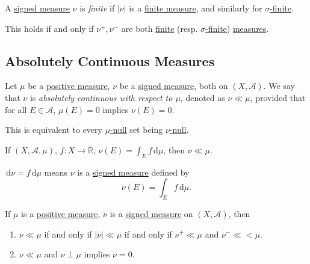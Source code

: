\begin{definition}\label{def:finite-signed-measure}
	A \hyperref[def:signed-measure]{signed measure} \(\nu\) is \emph{finite} if \(\left\vert \nu \right\vert\) is a \hyperref[def:finite-measure]{finite measure},
	and similarly for \hyperref[def:finite-measure]{\(\sigma\)-finite}.
\end{definition}
\begin{remark}
	This holds if and only if \(\nu^+,\nu^-\) are both \hyperref[def:finite-measure]{finite} (resp. \hyperref[def:finite-measure]{\(\sigma\)-finite})
	\hyperref[def:measure]{measures}.
\end{remark}

\subsection{Absolutely Continuous Measures}
\begin{definition}\label{def:absolutely-continuous}
	Let \(\mu\) be a \hyperref[def:signed-measure]{positive measure}, \(\nu\) be a \hyperref[def:signed-measure]{signed measure}, both on \((X, \mathcal{A})\). We say that \(\nu\) is
	\emph{absolutely continuous with respect to \(\mu\)}, denoted as \(\nu \ll \mu\), provided that for all \(E \in \mathcal{A}\), \(\mu(E) = 0\) implies \(\nu(E) = 0\).
\end{definition}
\begin{remark}
	This is equivalent to every \hyperref[def:null-set-for-a-signed-measure]{\(\mu\)-null} set being \hyperref[def:null-set-for-a-signed-measure]{\(\nu\)-null}.
\end{remark}
\begin{eg}
	If \((X ,\mathcal{A}, \mu)\), \(f \colon X \to \overline{\mathbb{R}}\), \(\nu(E) = \int_E f \,\mathrm{d} \mu\), then \(\nu \ll \mu\).
\end{eg}

\begin{notation}
	\(\,\mathrm{d} \nu = f \,\mathrm{d} \mu\) means \(\nu\) is a \hyperref[def:signed-measure]{signed measure} defined by
	\[
		\nu(E) = \int_E f \,\mathrm{d} \mu.
	\]
\end{notation}

\begin{lemma}
	If \(\mu\) is a \hyperref[def:signed-measure]{positive measure}, \(\nu\) is a \hyperref[def:signed-measure]{signed measure} on \((X, \mathcal{A})\), then
	\begin{enumerate}
		\item \(\nu \ll \mu\) if and only if \(\left\vert \nu \right\vert \ll \mu\) if and only if \(\nu^+ \ll \mu\) and \(\nu^- \ll< \mu\).
		\item \(\nu \ll \mu\) and \(\nu \perp \mu\) implies \(\nu = 0\).
	\end{enumerate}
\end{lemma}

